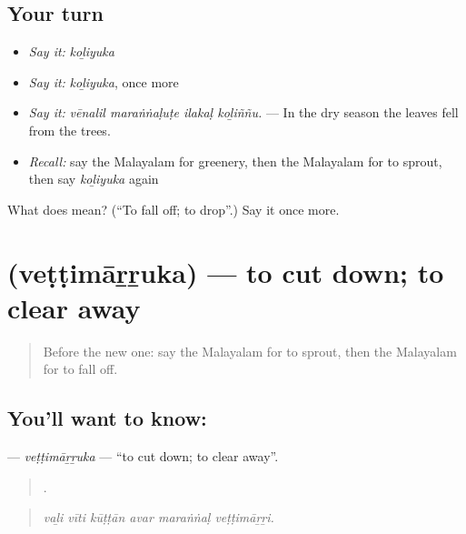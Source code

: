 \subsection*{Your turn}
\begin{itemize}
\raggedright
  \item \emph{Say it:} \emph{koḻiyuka}
  \item \emph{Say it:} \emph{koḻiyuka}, once more
  \item \emph{Say it:} \emph{vēnalil maraṅṅaḷuṭe ilakaḷ koḻiññu.} — In the dry season the leaves fell from the trees.
  \item \emph{Recall:} say the Malayalam for greenery, then the Malayalam for to sprout, then say \emph{koḻiyuka} again
\end{itemize}

\begin{tcolorbox}[breakable,colback=teal!4,colframe=teal!35!black,title={Before you move on}]
What does  mean? (\textquotedblleft{}To fall off; to drop\textquotedblright{}.) Say it once more.
\end{tcolorbox}
\section[\texorpdfstring{\ml{വെട്ടിമാറ്റുക} (veṭṭimāṟṟuka)}{വെട്ടിമാറ്റുക (veṭṭimāṟṟuka)}]{ (veṭṭimāṟṟuka) — to cut down; to clear away}

\label{lesson:ML-C502-vettimarruka}



\begin{quote}
Before the new one: say the Malayalam for to sprout, then the Malayalam for to fall off.
\end{quote}

\subsection*{You'll want to know: }
\textbf{} — \emph{veṭṭimāṟṟuka} — \textquotedblleft{}to cut down; to clear away\textquotedblright{}.

\begin{quote}
     .
\end{quote}

\begin{quote}
\emph{vaḻi vīti kūṭṭān avar maraṅṅaḷ veṭṭimāṟṟi.}
\end{quote}

